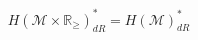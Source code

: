 \documentclass[licencjacka]{pracamgr}
\begin{document}
\[
    H(\mathcal{M} \times \mathbb{R}_{\geq})_{dR}^\ast = H(\mathcal{M})_{dR}^\ast
\]

\normalsize




\end{document}
